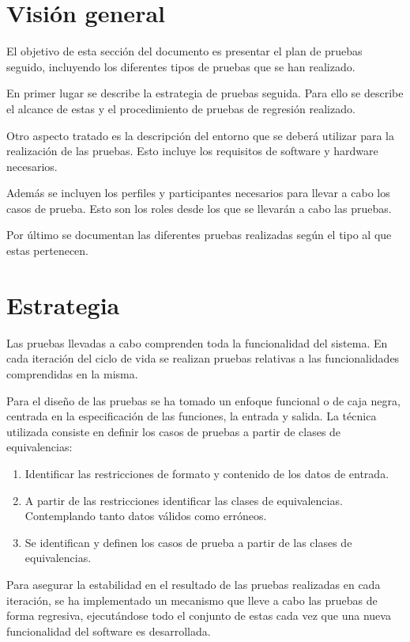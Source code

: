  \section {Visión general}
El objetivo de esta sección del documento es presentar el plan de pruebas seguido, 
incluyendo los diferentes tipos de pruebas que se han realizado. 

En primer lugar se describe la estrategia de pruebas seguida. Para ello se describe 
el alcance de estas y el procedimiento de pruebas de regresión realizado. 

Otro aspecto tratado es la descripción del entorno que se deberá utilizar para la
realización de las pruebas. Esto incluye los requisitos de software y hardware necesarios. 

Además se incluyen los perfiles y participantes necesarios para llevar a cabo los casos 
de prueba. Esto son los roles desde los que se llevarán a cabo las pruebas.

Por último se documentan las diferentes pruebas realizadas según el tipo al que estas pertenecen.

\section{Estrategia}
Las pruebas llevadas a cabo comprenden toda la funcionalidad del sistema. En cada iteración del ciclo de
vida se realizan pruebas relativas a las funcionalidades comprendidas en la misma. 

Para el diseño de las pruebas se ha tomado un enfoque funcional o de caja negra, centrada en la 
especificación de las funciones, la entrada y salida. La técnica utilizada consiste en definir 
los casos de pruebas a partir de clases de equivalencias:

\begin{enumerate}
\item Identificar las restricciones de formato y contenido de los datos de entrada.
\item A partir de las restricciones identificar las clases de equivalencias. Contemplando tanto 
datos válidos como erróneos.
\item Se identifican y definen los casos de prueba a partir de las clases de equivalencias.
\end{enumerate}

Para asegurar la estabilidad en el resultado de las pruebas realizadas en cada iteración, se ha implementado un mecanismo
que lleve a cabo las pruebas de forma regresiva, ejecutándose todo el conjunto de estas cada vez que una nueva funcionalidad 
del software es desarrollada. 

